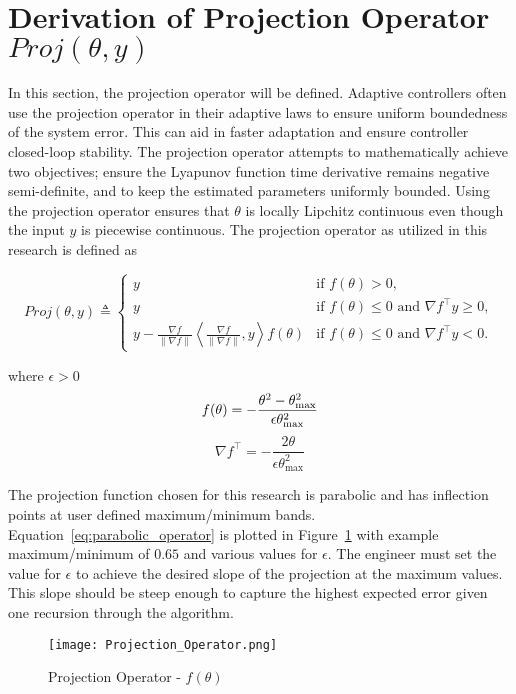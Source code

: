 \label{appendix:projection_derivation}
\section{ Derivation of Projection Operator $Proj(\theta,y)$}

In this section, the projection operator will be defined.  Adaptive controllers often use the projection operator in their adaptive laws to ensure uniform boundedness of the system error.  This can aid in faster adaptation and ensure controller closed-loop stability.  The projection operator attempts to mathematically achieve two objectives; ensure the Lyapunov function time derivative remains negative semi-definite, and to keep the estimated parameters uniformly bounded.  Using the projection operator ensures that $\theta$ is locally Lipchitz continuous even though the input $y$ is piecewise continuous.  The projection operator as utilized in this research is defined as

\begin{equation}
Proj(\theta,y)\triangleq 	
	\begin{cases}
	y& \text{if }f(\theta)>0, \\
	y& \text{if }f(\theta) \leq 0\text{ and }\nabla f^\top y\geq 0,\\
	y-\frac{\nabla f}{\|\nabla f\|}\left\langle\frac{\nabla f}{\|\nabla f\|},y\right\rangle f(\theta)& \text{if }f(\theta)\leq 0\text{ and }\nabla f^\top y< 0.
	\end{cases}	
\end{equation}

where $\epsilon>0$
\begin{equation}\label{eq:parabolic_operator}
	f(\theta)=-\frac{\theta^2-\theta_{\text{max}}^2}{\epsilon \theta_{\text{max}}^2}\\
\end{equation}
\begin{equation}
	\nabla f^\top=-\frac{2\theta}{\epsilon \theta_{\text{max}}^2}
\end{equation}

The projection function chosen for this research is parabolic and has inflection points at user defined maximum/minimum bands.  Equation~\ref{eq:parabolic_operator} is plotted in Figure~\ref{fig:projection_operator} with example maximum/minimum of $0.65$ and various values for $\epsilon$.  The engineer must set the value for $\epsilon$ to achieve the desired slope of the projection at the maximum values.  This slope should be steep enough to capture the highest expected error given one recursion through the algorithm.
\begin{figure}[h!]
 \centering
  \texttt{[image: Projection\_Operator.png]}
  \caption{Projection Operator - $f(\theta)$}
  \label{fig:projection_operator}
\end{figure}

